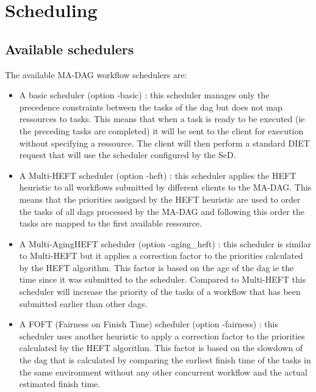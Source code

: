 \section{Scheduling}

\label{sec:wf_sched}

\subsection{Available schedulers}

The available MA-DAG workflow schedulers are:

\begin{itemize}

\item A basic scheduler (option -basic) : this scheduler manages only
the precedence constraints between the tasks of the dag but does not
map ressources to tasks. This means that when a task is ready to be
executed (ie the preceding tasks are completed) it will be sent to
the client for execution without specifying a ressource. The client
will then perform a standard DIET request that will use the scheduler
configured by the SeD.

\item A Multi-HEFT scheduler (option -heft) : this scheduler applies
the HEFT heuristic to all workflows submitted by different clients to
the MA-DAG. This means that the priorities assigned by the HEFT
heuristic are used to order the tasks of all dags processed by the
MA-DAG and following this order the tasks are mapped to the first
available ressource.

\item A Multi-AgingHEFT scheduler (option -aging\_heft) : this scheduler
is similar to Multi-HEFT but it applies a correction factor to the
priorities calculated by the HEFT algorithm. This factor is based on
the age of the dag ie the time since it was submitted to the scheduler.
Compared to Multi-HEFT this scheduler will increase the priority of the
tasks of a workflow that has been submitted earlier than other dags.

\item A FOFT (Fairness on Finish Time) scheduler (option -fairness) :
this scheduler uses another heuristic to apply a correction factor to
the priorities calculated by the HEFT algorithm. This factor is based
on the slowdown of the dag that is calculated by comparing the earliest
finish time of the tasks in the same environment without any other
concurrent workflow and the actual estimated finish time.

\end{itemize}


